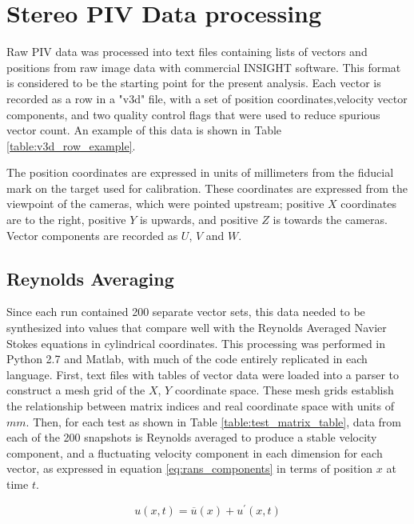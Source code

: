 \section{Stereo PIV Data processing}

Raw PIV data was processed into text files containing lists of vectors and 
positions from raw image data with commercial INSIGHT software. 
This format is considered to be the 
starting point for the present analysis. Each vector is recorded as a row in a 
"v3d" file, with a set of position coordinates,velocity 
vector components, and two quality control flags that were used to reduce 
spurious vector count. An example of this data is shown in Table 
\ref{table:v3d_row_example}.



The position coordinates are expressed in units of millimeters from 
the fiducial mark on the target used for calibration. These coordinates are 
expressed from the viewpoint of the cameras, which were pointed upstream; 
positive $X$ coordinates are to the right, positive $Y$ is upwards, and 
positive $Z$ is towards the cameras. Vector components are recorded as $U$, 
$V$ and $W$. 

\subsection{Reynolds Averaging}
Since each run contained 200 separate vector sets, this data needed to be 
synthesized into 
values that compare well with the Reynolds Averaged Navier Stokes equations in 
cylindrical coordinates. This processing was performed in Python 2.7 and 
Matlab, with much of the code entirely replicated in each language. 
First, text files with tables of vector data were loaded into a parser to 
construct a mesh grid of the $X$, $Y$ coordinate space. These mesh grids 
establish the relationship between matrix indices and real coordinate 
space with units of $mm$.
Then, for each test as shown in Table \ref{table:test_matrix_table}, data from 
each of the 200 snapshots is Reynolds averaged to produce a stable velocity 
component, and a fluctuating velocity component in each dimension for each 
vector, as expressed in equation \ref{eq:rans_components} in terms of position 
$x$ at time $t$.

\begin{equation}
u(x,t) = \overline{u}(x) + u^\prime(x,t)
\label{eq:rans_components}
\end{equation}


